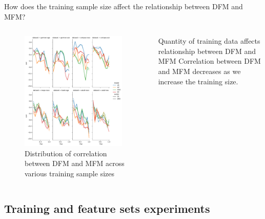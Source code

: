 \documentclass[aspectratio=169]{beamer}
\begin{document}
\begin{frame}{How does the training sample size affect the
    relationship between DFM and MFM?}
    \begin{columns}[c, onlytextwidth]
      \begin{figure}
        \centering
        \includegraphics[width=0.95\textwidth]{lineplot--frac--corr.pdf}
        \caption{Distribution of correlation between DFM and MFM across
          various training sample sizes}
        \label{fig:lineplot--frac--corr}
      \end{figure}

      \begin{exampleblock}{Quantity of training data affects
        relationship between DFM and MFM}
        Correlation between DFM and MFM \alert{decreases} as we
        \textcolor{example}{increase} the training size.
      \end{exampleblock}
    \end{columns}
\end{frame}

\subsection{Training and feature sets experiments}
\end{document}
